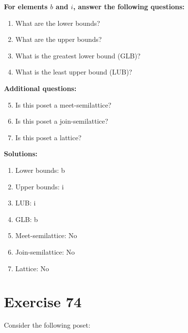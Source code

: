 \documentclass{article}
\begin{document}
    \textbf{For elements $b$ and $i$, answer the following questions:}
\begin{enumerate}
    \item What are the lower bounds?
    \item What are the upper bounds?
    \item What is the greatest lower bound (GLB)?
    \item What is the least upper bound (LUB)?
\end{enumerate}
    \hspace*{3ex} \textbf{Additional questions:}
\begin{enumerate}
    \setcounter{enumi}{4}
    \item Is this poset a meet-semilattice?
    \item Is this poset a join-semilattice?
    \item Is this poset a lattice?
\end{enumerate}

\textbf{Solutions:}
\begin{enumerate}
    \item Lower bounds: {b}
    \item Upper bounds: {i}
    \item LUB: i
    \item GLB: b
    \item Meet-semilattice: No
    \item Join-semilattice: No
    \item Lattice: No
\end{enumerate}
\newpage
\section*{Exercise 74}
Consider the following poset:
\begin{center}
\end{center}
\end{document}
